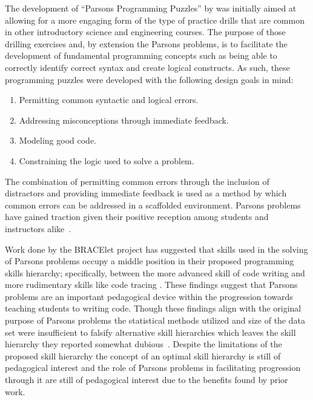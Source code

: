 \documentclass[]{acmart}
\begin{document}
The development of ``Parsons Programming Puzzles'' by \citet{parsons2006parson}
was initially aimed at allowing for a more engaging form of the type of
practice drills that are common in other introductory science and engineering
courses. The purpose of those drilling exercises and, by extension the Parsons
problems, is to facilitate the development of fundamental programming concepts
such as being able to correctly identify correct syntax and create logical
constructs.  As such, these programming puzzles were developed with the
following design goals in mind:
\begin{enumerate}
    \item Permitting common syntactic and logical errors.
    \item Addressing misconceptions through immediate feedback.
    \item Modeling good code.
    \item Constraining the logic used to solve a problem.
\end{enumerate}
The combination of permitting common errors through the inclusion of
distractors and providing immediate feedback is used as a method by which
common errors can be addressed in a scaffolded environment.  Parsons problems
have gained traction given their positive reception among students and
instructors alike~\cite{ericson2015analysis, ericson2016identifying}.

Work done by the BRACElet project has suggested that skills used in the solving
of Parsons problems occupy a middle position in their proposed programming
skills hierarchy; specifically, between the more advanced skill of code writing
and more rudimentary skills like code tracing \cite{whalley2007many,
lopez2008relationships, venables2009closer}. These findings suggest that Parsons
problems are an important pedagogical device within the progression towards
teaching students to writing code. Though these findings align with the original
purpose of Parsons problems the statistical methods utilized and size of the
data set were insufficient to falsify alternative skill hierarchies which leaves
the skill hierarchy they reported somewhat
dubious~\cite{fowler2022reevaluating}.  Despite the limitations of the proposed
skill hierarchy the concept of an optimal skill hierarchy is still of
pedagogical interest and the role of Parsons problems in facilitating
progression through it are still of pedagogical interest due to the benefits
found by prior work. 
\end{document}
